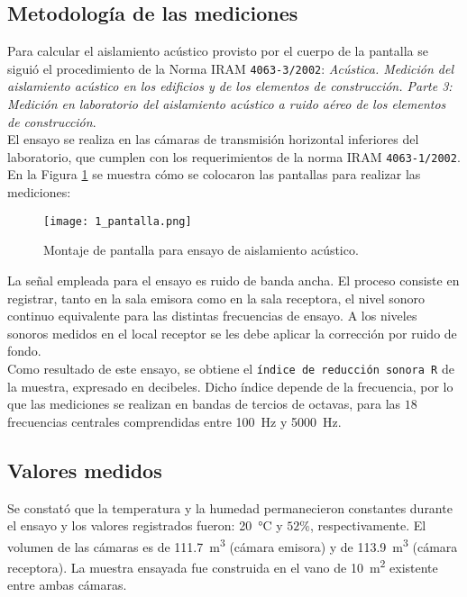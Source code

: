 		\subsection{Metodología de las mediciones}
		
	Para calcular el aislamiento acústico provisto por el cuerpo de la pantalla se siguió el procedimiento de la Norma IRAM \texttt{4063-3/2002}: \textit{Acústica. Medición del aislamiento acústico en los edificios y de los elementos de construcción. Parte 3: Medición en laboratorio del aislamiento acústico a ruido aéreo de los elementos de construcción}.\\

	El ensayo se realiza en las cámaras de transmisión horizontal inferiores del laboratorio, que cumplen con los requerimientos de la norma IRAM \texttt{4063-1/2002}.\\
	
	En la Figura \ref{1_pantalla} se muestra cómo se colocaron las pantallas para realizar las mediciones:
	
		\begin{figure}[H]
			\centering
			\texttt{[image: 1\_pantalla.png]}\\
			\caption{Montaje de pantalla para ensayo de aislamiento acústico.}
			\label{1_pantalla}
		\end{figure}
	
	La señal empleada para el ensayo es ruido de banda ancha. El proceso consiste en registrar, tanto en la sala emisora como en la sala receptora, el nivel sonoro continuo equivalente para las distintas frecuencias de ensayo. A los niveles sonoros medidos en el local receptor se les debe aplicar la corrección por ruido de fondo.\\
	
	Como resultado de este ensayo, se obtiene el \texttt{índice de reducción sonora R} de la muestra, expresado en decibeles. Dicho índice depende de la frecuencia, por lo que las mediciones se realizan en bandas de tercios de octavas, para las $18$ frecuencias centrales comprendidas entre \SI{100}{\Hz} y \SI{5000}{\Hz}.
	
	\subsection{Valores medidos}
	
	Se constató que la temperatura y la humedad permanecieron constantes durante el ensayo y los valores registrados fueron: \SI{20}{\celsius} y $52\%$, respectivamente. El volumen de las cámaras es de \SI{111.7}{\cubic\meter} (cámara emisora) y de \SI{113.9}{\cubic\meter} (cámara receptora). La muestra ensayada fue construida en el vano de \SI{10}{\square\meter} existente entre ambas cámaras.\\
	
